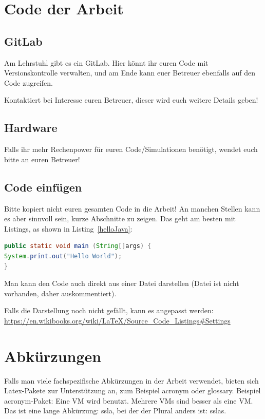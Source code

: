 \section{Code der Arbeit}
\subsection{GitLab} Am Lehrstuhl gibt es ein GitLab. Hier könnt ihr euren Code mit Versionskontrolle verwalten,
und am Ende kann euer Betreuer ebenfalls auf den Code zugreifen. 

Kontaktiert bei Interesse euren Betreuer, dieser wird euch weitere Details geben!

\subsection{Hardware}
Falls ihr mehr Rechenpower für euren Code/Simulationen benötigt, wendet euch bitte an euren Betreuer!


\subsection{Code einfügen} Bitte kopiert nicht euren gesamten Code in die Arbeit! An manchen Stellen kann es aber sinnvoll sein,
kurze Abschnitte zu zeigen. Das geht am besten mit Listings, as shown in Listing~\ref{helloJava}:

\begin{lstlisting}[language=java, caption=Hello World in Java, label=helloJava]
public static void main (String[]args) {
System.print.out("Hello World");
}
\end{lstlisting}

Man kann den Code auch direkt aus einer Datei darstellen (Datei ist nicht vorhanden, daher auskommentiert).
%

Falls die Darstellung noch nicht gefällt, kann es angepasst werden: \url{https://en.wikibooks.org/wiki/LaTeX/Source_Code_Listings#Settings}

\section{Abkürzungen}
Falls man viele fachspezifische Abkürzungen in der Arbeit verwendet, bieten sich Latex-Pakete zur Unterstützung an, zum Beispiel acronym oder glossary.
Beispiel acronym-Paket: Eine \ac{VM} wird benutzt. Mehrere \acp{VM} sind besser als eine \ac{VM}.
Das ist eine lange Abkürzung: \ac{ssla}, bei der der Plural anders ist: \acp{ssla}.



